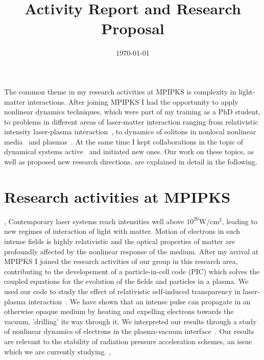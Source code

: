 \documentclass[11pt,a4paper,final]{moderncv}
\title{\large{Activity Report and Research Proposal}}               %
\date{\today}
\begin{document}
\maketitle


The common theme in my research activities at MPIPKS is complexity in light-matter interactions. After joining MPIPKS
I had the opportunity to apply nonlinear dynamics techniques, which were part of my training as a PhD student, to 
problems in different areas of laser-matter interaction ranging from relativistic intensity laser-plasma interaction~\cite{siminos2012},
to dynamics of solitons in nonlocal nonlinear media~\cite{maucher2013} and plasmas~\cite{saxena2013}. 
At the same time I kept collaborations in the topic of dynamical systems active~\cite{atlas12} and initiated new ones.
Our work on these topics, as well as proposed new research directions, are explained in detail in the following.
 


\section{Research activities at MPIPKS}
\sep
{}
Contemporary laser systems reach intensities well above $10^{20}\mathrm{W/cm^2}$, 
leading to new regimes of interaction of light with matter. Motion of
electrons in such intense fields is highly relativistic and the optical
properties of matter are profoundly affected by the nonlinear response
of the medium. After my arrival at MPIPKS I joined the research activities of our
group in this research area, contributing to the developement of a particle-in-cell code (PIC) 
which solves the coupled equations for the evolution of the fields and particles in
a plasma. We used our code to study the effect of relativistic self-induced
transparency in laser-plasma interaction~\cite{kaw1970,palaniyappan2012}.
We have shown that an intense pulse 
can propagate in an otherwise opaque medium by heating and expelling electrons towards the vacuum, 
'drilling' its way through it. We interpreted our results through a study of nonlinear 
dynamics of electrons in the plasma-vacuum interface~\cite{siminos2012}. 
Our results are relevant to the stability of radiation pressure acceleration schemes, 
an issue which we are currently studying.
\sep 
\end{document}
